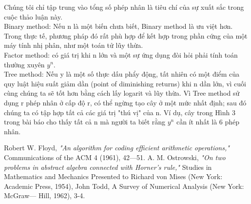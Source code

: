 \documentclass{article}
\begin{document}
\begin{multicols}{3}
{\begin{minipage}[t]{.96\linewidth}
    \Large

    \qquad Chúng tôi chỉ tập trung vào tổng số phép nhân là tiêu chí của sự xuất sắc trong cuộc thảo luận này.\\
    \indent \qquad Binary method: Nếu n là một biến chưa biết, Binary method là ưu việt hơn. Trong thực tế, phương pháp đó
     rất phù hợp để kết hợp trong phần cứng của một máy tính nhị phân, như một toán tử lũy thừa.\\
    \indent \qquad Factor method: có giá trị khi n lớn và một sự ứng dụng đòi hỏi phải tính toán thường xuyên $y^n$.\\
    \indent \qquad Tree method: Nếu y là một số thực dấu phẩy động, tất nhiên có một điểm của quy luật hiệu suất giảm dần 
    (point of diminishing returns) khi n dần lớn, vì cuối cùng chúng ta sẽ tốt hơn bằng cách lấy logarit và 
    lũy thừa. Vì Tree method sử dụng r phép nhân ở cấp độ r, có thể ngừng tạo cây ở một mức nhất định; sau đó
     chúng ta có tập hợp tất cả các giá trị "thú vị" của n. Ví dụ, cây trong Hình 3 trong bài báo cho thấy tất
      cả n mà người ta biết rằng $y^n$ cần ít nhất là 6 phép nhân.

    \hspace{.05cm}
  \end{minipage}
}

\vspace{.5cm}

%
\small
\begin{thebibliography}{}


\bibitem Robert W. Floyd, \emph{"An algorithm for coding efficient arithmetic operations,"} Communications of the ACM 4 (1961), 42—51.
\bibitem A. M. Ostrowski, \emph{"On two problems in abstract algebra connected with Horner's rule,"} Studies in Mathematics and Mechanics 
Presented to Richard von Mises (New York: Academic Press, 1954),
\bibitem John Todd, A Survey of Numerical Analysis (New York: McGraw— Hill, 1962), 3-4.

\end{thebibliography}

\end{multicols}
\end{document}
